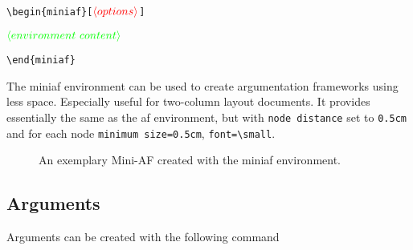 \documentclass{article}
\newcommand{\opt}[2][red]{\ensuremath{\textcolor{#1}{\langle #2\rangle}}}
\begin{document}
\noindent
\verb|\begin{miniaf}[|\opt{options}\verb|]|

\opt[green]{environment~content}

\noindent
\verb|\end{miniaf}|

\begin{list}{}{\leftmargin=\parindent\rightmargin=0pt}
    \item
    The \textsf{miniaf} environment can be used to create argumentation frameworks using less space.
    Especially useful for two-column layout documents.
    It provides essentially the same as the \textsf{af} environment, but with \verb|node distance| set to \verb|0.5cm| and for each node \verb|minimum size=0.5cm|, \verb|font=\small|.
\end{list}


\begin{figure}[ht]
    \centering
    \begin{miniaf}





    \end{miniaf}
    \caption{An exemplary Mini-AF created with the \textsf{miniaf} environment.}
    \label{fig:example_mini}
\end{figure}


\subsection{Arguments}
    Arguments can be created with the following command\\
\end{document}
